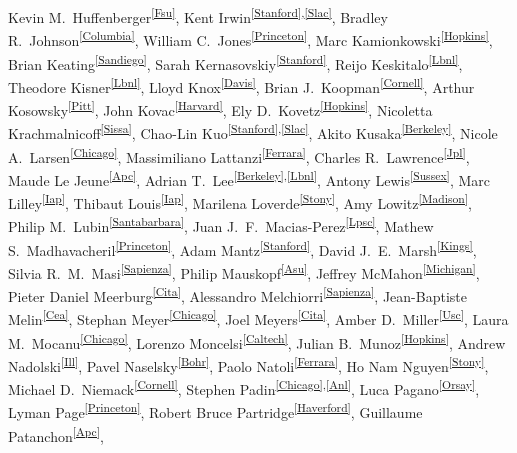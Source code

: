 Kevin M.~Huffenberger\textsuperscript{\ref{Fsu}},
Kent Irwin\textsuperscript{\ref{Stanford},\ref{Slac}},
Bradley R.~Johnson\textsuperscript{\ref{Columbia}}, 
William C.~Jones\textsuperscript{\ref{Princeton}},
Marc Kamionkowski\textsuperscript{\ref{Hopkins}},
Brian Keating\textsuperscript{\ref{Sandiego}},
Sarah Kernasovskiy\textsuperscript{\ref{Stanford}},
Reijo Keskitalo\textsuperscript{\ref{Lbnl}},
Theodore Kisner\textsuperscript{\ref{Lbnl}},
Lloyd Knox\textsuperscript{\ref{Davis}},
Brian J.~Koopman\textsuperscript{\ref{Cornell}},
Arthur Kosowsky\textsuperscript{\ref{Pitt}},
John Kovac\textsuperscript{\ref{Harvard}},
Ely D.~Kovetz\textsuperscript{\ref{Hopkins}},
Nicoletta Krachmalnicoff\textsuperscript{\ref{Sissa}},
Chao-Lin Kuo\textsuperscript{\ref{Stanford},\ref{Slac}},
Akito Kusaka\textsuperscript{\ref{Berkeley}},
Nicole A.~Larsen\textsuperscript{\ref{Chicago}},
Massimiliano Lattanzi\textsuperscript{\ref{Ferrara}},
Charles R.~Lawrence\textsuperscript{\ref{Jpl}},
Maude Le Jeune\textsuperscript{\ref{Apc}},
Adrian T.~Lee\textsuperscript{\ref{Berkeley},\ref{Lbnl}},
Antony Lewis\textsuperscript{\ref{Sussex}},
Marc Lilley\textsuperscript{\ref{Iap}},
Thibaut Louis\textsuperscript{\ref{Iap}},
Marilena Loverde\textsuperscript{\ref{Stony}},
Amy Lowitz\textsuperscript{\ref{Madison}},
Philip M.~Lubin\textsuperscript{\ref{Santabarbara}},
Juan J.~F.~Macias-Perez\textsuperscript{\ref{Lpsc}},
Mathew S.~Madhavacheril\textsuperscript{\ref{Princeton}},
Adam Mantz\textsuperscript{\ref{Stanford}},
David J.~E.~Marsh\textsuperscript{\ref{Kings}},
Silvia R.~M.~Masi\textsuperscript{\ref{Sapienza}},
Philip Mauskopf\textsuperscript{\ref{Asu}},
Jeffrey McMahon\textsuperscript{\ref{Michigan}},
Pieter Daniel Meerburg\textsuperscript{\ref{Cita}},
Alessandro Melchiorri\textsuperscript{\ref{Sapienza}},
Jean-Baptiste Melin\textsuperscript{\ref{Cea}},
Stephan Meyer\textsuperscript{\ref{Chicago}},
Joel Meyers\textsuperscript{\ref{Cita}},
Amber D.~Miller\textsuperscript{\ref{Usc}},
Laura M.~Mocanu\textsuperscript{\ref{Chicago}},
Lorenzo Moncelsi\textsuperscript{\ref{Caltech}},
Julian B.~Munoz\textsuperscript{\ref{Hopkins}},
Andrew Nadolski\textsuperscript{\ref{Ill}},
Pavel Naselsky\textsuperscript{\ref{Bohr}},
Paolo Natoli\textsuperscript{\ref{Ferrara}},
Ho Nam Nguyen\textsuperscript{\ref{Stony}},
Michael D.~Niemack\textsuperscript{\ref{Cornell}},
Stephen Padin\textsuperscript{\ref{Chicago},\ref{Anl}},
Luca Pagano\textsuperscript{\ref{Orsay}},
Lyman Page\textsuperscript{\ref{Princeton}},
Robert Bruce Partridge\textsuperscript{\ref{Haverford}},
Guillaume Patanchon\textsuperscript{\ref{Apc}},
